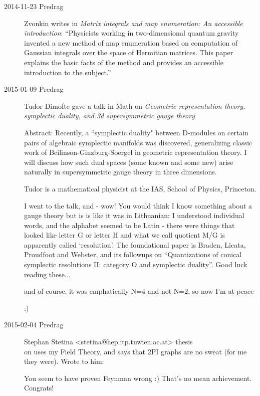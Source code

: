 \begin{description}
\item[2014-11-23 Predrag]
Zvonkin 
writes in
{\em Matrix integrals and map enumeration: {An} accessible introduction}:
``Physicists working in two-dimensional quantum gravity invented a new
method of map enumeration based on computation of Gaussian integrals over
the space of Hermitian matrices. This paper explains the basic facts of
the method and provides an accessible introduction to the subject.''

\item[2015-01-09 Predrag]

Tudor Dimofte gave a talk in Math on
{\em Geometric representation theory, symplectic duality, and 3d
supersymmetric gauge theory}

Abstract: Recently, a ``symplectic duality" between D-modules on certain
pairs of algebraic symplectic manifolds was discovered, generalizing
classic work of Beilinson-Ginzburg-Soergel in geometric representation
theory. I will discuss how such dual spaces (some known and some new) arise
naturally in supersymmetric gauge theory in three dimensions.

Tudor is a mathematical physicist at the IAS,
School of Physics, Princeton.

I went to the talk, and - wow! You would think I know something about a
gauge theory but is is like it was in Lithuanian: I understood individual
words, and the alphabet seemed to be Latin - there were things that
looked like letter G or letter H and what we call quotient M/G is
apparently called `resolution'. The foundational paper is Braden, Licata,
Proudfoot and Webster, and its followups on
``Quantizations of conical symplectic resolutions II: category O and
symplectic duality''. Good luck reading these...

and of course, it was emphatically N=4 and not N=2, so now I'm at peace

:)

\item[2015-02-04 Predrag] Stephan Stetina
    <stetina@hep.itp.tuwien.ac.at> thesis \\
    on  uses my
     {Field Theory}, and says
    that 2PI graphs are no sweat (for me they were). Wrote to him:

You seem to have
{proven Feynman wrong} :) That's no mean achievement. Congrats!


\end{description}
